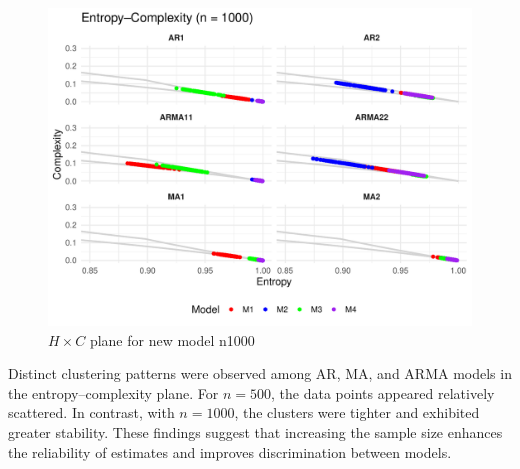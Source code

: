 \documentclass[12pt,a4paper]{article}
\begin{document}
\begin{figure}[H]
	\includegraphics[width=0.9 \textwidth]{New_model_group_plot_n1000}
	\caption{$H \times C$ plane for new model n1000}
	\label{fig:HC new n1000}
\end{figure}

Distinct clustering patterns were observed among AR, MA, and ARMA models in the entropy–complexity plane. For 
$n=500$, the data points appeared relatively scattered. In contrast, with $n=1000$, the clusters were tighter and exhibited greater stability. These findings suggest that increasing the sample size enhances the reliability of estimates and improves discrimination between models.
	
%	
	
\end{document}
